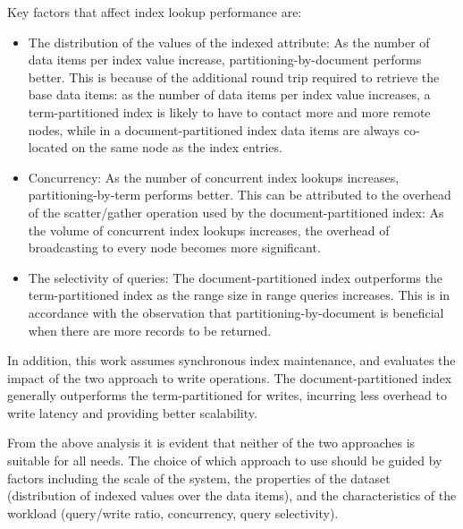 Key factors that affect index lookup performance are:
\begin{itemize}

  \item The distribution of the values of the indexed attribute:
  As the number of data items per index value increase, partitioning-by-document performs better.
  This is because of the additional round trip required to retrieve the base data items:
  as the number of data items per index value increases, a term-partitioned index is likely to have to contact
  more and more remote nodes, while in a document-partitioned index data items are always co-located on the same node as
  the index entries.

  \item Concurrency:
  As the number of concurrent index lookups increases, partitioning-by-term performs better.
  This can be attributed to the overhead of the scatter/gather operation used by the document-partitioned index:
  As the volume of concurrent index lookups increases,
  the overhead of broadcasting to every node becomes more significant.

  \item The selectivity of queries:
  The document-partitioned index outperforms the term-partitioned index as the range size in range queries increases.
  This is in accordance with the observation that partitioning-by-document is beneficial when there are
  more records to be returned.

\end{itemize}

In addition, this work assumes synchronous index maintenance, and evaluates the impact of the two approach to write
operations.
The document-partitioned index generally outperforms the term-partitioned for writes,
incurring less overhead to write latency and providing better scalability.

From the above analysis it is evident that neither of the two approaches is suitable for all needs.
The choice of which approach to use should be guided by factors including the scale of the system,
the properties of the dataset (distribution of indexed values over the data items),
and the characteristics of the workload (query/write ratio, concurrency, query selectivity).

